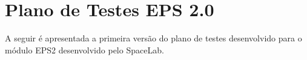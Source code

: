 \chapter{Plano de Testes EPS 2.0}

A seguir é apresentada a primeira versão do plano de testes desenvolvido para o módulo \gls{EPS2} desenvolvido pelo SpaceLab.




